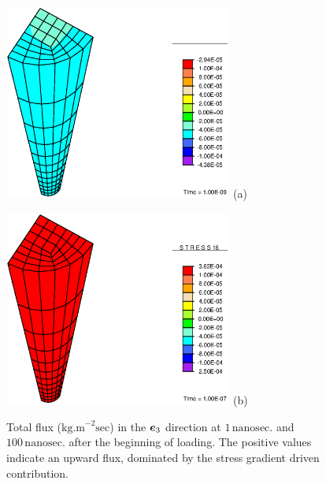 \begin{figure}[!hpt]
\begin{minipage}[t]{7.5cm}
{\includegraphics[width=7.5cm]{images/examples/lagrangian/preliminary/M-1}} \hskip 3cm (a)
\end{minipage}
\begin{minipage}[t]{7.5cm}
{\includegraphics[width=7.5cm]{images/examples/lagrangian/preliminary/M-100}} \hskip 3cm (b)
\end{minipage}
\caption{Total flux ($\mathrm{kg.m}^{-2}\mathrm{sec}$) in the
$\mbox{\boldmath$ e$}_3$ direction at $1 \,\mathrm{nanosec.}$ and
$100\,\mathrm{nanosec.}$ after the beginning of loading. The
positive values indicate an upward flux, dominated by the stress
gradient driven contribution.} \label{Mfig}
\end{figure}

